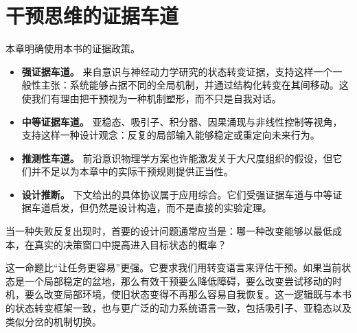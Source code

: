 \section{干预思维的证据车道}

本章明确使用本书的证据政策。

\begin{itemize}[nosep]
  \item \textbf{强证据车道。} 来自意识与神经动力学研究的状态转变证据，支持这样一个一般性主张：系统能够占据不同的全局机制，并通过结构化转变在其间移动。这使我们有理由把干预视为一种机制塑形，而不只是自我对话。
  \item \textbf{中等证据车道。} 亚稳态、吸引子、积分器、因果涌现与非线性控制等视角，支持这样一种设计观念：反复的局部输入能够稳定或重定向未来行为。
  \item \textbf{推测性车道。} 前沿意识物理学方案也许能激发关于大尺度组织的假设，但它们并不足以为本章中的实际干预规则提供正当性。
  \item \textbf{设计推断。} 下文给出的具体协议属于应用综合。它们受强证据车道与中等证据车道启发，但仍然是设计构造，而不是直接的实验定理。
\end{itemize}

\begin{proposition}[干预应瞄准转变几何结构]
当一种失败反复出现时，首要的设计问题通常应当是：哪一种改变能够以最低成本，在真实的决策窗口中提高进入目标状态的概率？
\end{proposition}

\begin{discussion}
这一命题比“让任务更容易”更强。它要求我们用转变语言来评估干预。如果当前状态是一个局部稳定的盆地，那么有效干预要么降低障碍，要么改变尝试移动的时机，要么改变局部环境，使旧状态变得不再那么容易自我恢复。这一逻辑既与本书的状态转变框架一致，也与更广泛的动力系统语言一致，包括吸引子、亚稳态以及类似分岔的机制切换。
\end{discussion}
